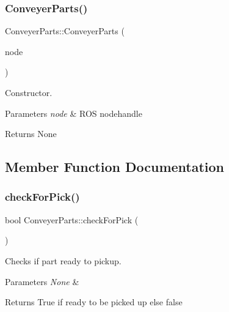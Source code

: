 \subsubsection{\texorpdfstring{Conveyer\+Parts()}{ConveyerParts()}}
{\footnotesize\ttfamily Conveyer\+Parts\+::\+Conveyer\+Parts (\begin{DoxyParamCaption}\item[{ros\+::\+Node\+Handle \&}]{node }\end{DoxyParamCaption})}



Constructor. 


\begin{DoxyParams}{Parameters}
{\em node} & R\+OS nodehandle \\
\hline
\end{DoxyParams}
\begin{DoxyReturn}{Returns}
None 
\end{DoxyReturn}


\subsection{Member Function Documentation}
\mbox{\label{classConveyerParts_a8a536ff479f28fcb38cf454a41f8387e}} 
\subsubsection{\texorpdfstring{check\+For\+Pick()}{checkForPick()}}
{\footnotesize\ttfamily bool Conveyer\+Parts\+::check\+For\+Pick (\begin{DoxyParamCaption}{ }\end{DoxyParamCaption})}



Checks if part ready to pickup. 


\begin{DoxyParams}{Parameters}
{\em None} & \\
\hline
\end{DoxyParams}
\begin{DoxyReturn}{Returns}
True if ready to be picked up else false 
\end{DoxyReturn}
\mbox{\label{classConveyerParts_aaa9a8364efc6d4247d8d5585b6b21859}} 
